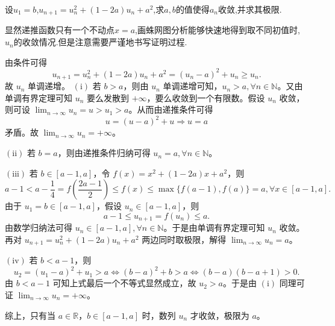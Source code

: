 \documentclass[../../main.tex]{subfiles}%
\begin{document}
\begin{example}
设\(u_1 = b\),\(u_{n + 1}=u_{n}^{2}+(1 - 2a)u_{n}+a^{2}\),求$a,b$的值使得$a_n$收敛,并求其极限.
\end{example}
\begin{note}
显然递推函数只有一个不动点$x=a$,画蛛网图分析能够快速地得到取不同初值时,$u_n$的收敛情况.但是注意需要严谨地书写证明过程.
\end{note}
\begin{solution}

由条件可得
\[
u_{n + 1}=u_{n}^{2}+(1 - 2a)u_n + a^2=(u_n - a)^2 + u_n\geqslant u_n.
\]
故 \(u_n\) 单调递增。 
\((\mathrm{i})\) 若 \(b > a\)，则由 \(u_n\) 单调递增可知，\(u_n > a,\forall n\in \mathbb{N}\)。又由单调有界定理可知 \(u_n\) 要么发散到 \(+\infty\)，要么收敛到一个有限数。假设 \(u_n\) 收敛，则可设 \(\lim_{n\rightarrow \infty}u_n = u > u_1 > a\)。从而由递推条件可得
\[
u=(u - a)^2 + u\Rightarrow u = a
\]
矛盾。故 \(\lim_{n\rightarrow \infty}u_n = +\infty\)。

\((\mathrm{ii})\) 若 \(b = a\)，则由递推条件归纳可得 \(u_n = a,\forall n\in \mathbb{N}\)。

\((\mathrm{iii})\) 若 \(b\in [a - 1,a]\)，令 \(f(x)=x^2+(1 - 2a)x + a^2\)，则
\[
a - 1 < a - \frac{1}{4}=f\left(\frac{2a - 1}{2}\right)\leqslant f(x)\leqslant \max\{f(a - 1),f(a)\}=a,\forall x\in [a - 1,a].
\]
由于 \(u_1 = b\in [a - 1,a]\)，假设 \(u_n\in [a - 1,a]\)，则
\[
a - 1\leqslant u_{n + 1}=f(u_n)\leqslant a.
\]
由数学归纳法可得 \(u_n\in [a - 1,a],\forall n\in \mathbb{N}\)。于是由单调有界定理可知 \(u_n\) 收敛。再对 \(u_{n + 1}=u_{n}^{2}+(1 - 2a)u_n + a^2\) 两边同时取极限，解得 \(\lim_{n\rightarrow \infty}u_n = a\)。

\((\mathrm{iv})\) 若 \(b < a - 1\)，则
\[
u_2=(u_1 - a)^2 + u_1 > a\Leftrightarrow (b - a)^2 + b > a\Leftrightarrow (b - a)(b - a + 1) > 0.
\]
由 \(b < a - 1\) 可知上式最后一个不等式显然成立，故 \(u_2 > a\)。于是由 \((\mathrm{i})\) 同理可证 \(\lim_{n\rightarrow \infty}u_n = +\infty\)。

综上，只有当 \(a\in \mathbb{R}\)，\(b\in [a - 1,a]\) 时，数列 \(u_n\) 才收敛，极限为 \(a\)。

\end{solution}
\end{document}
